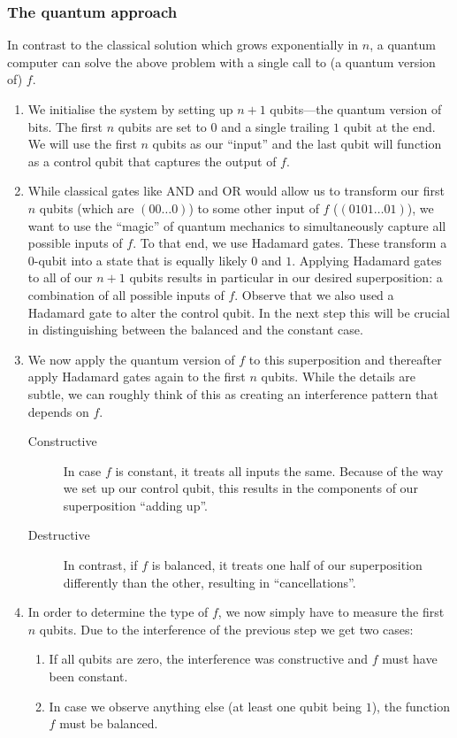 \documentclass[a4paper, oneside, 12pt]{amsart}
\begin{document}
\subsubsection*{The quantum approach}
In contrast to the classical solution which grows exponentially in \(n\), a quantum computer can solve the above problem with a single call to (a quantum version of) \(f\).
\begin{enumerate}
  \item[Step 1:] We initialise the system by setting up \(n+1\) qubits---the quantum version of bits.
  The first \(n\) qubits are set to \(0\) and a single trailing \(1\) qubit at the end.
  We will use the first \(n\) qubits as our ``input'' and the last qubit will function as a control qubit that captures the output of \(f\).

  \item [Step 2:] While classical gates like AND and OR would allow us to transform our first \(n\) qubits (which are \((00\dots0)\)) to some other input of \(f\) (\eg \((0101\dots 01)\)), we want to use the ``magic'' of quantum mechanics to simultaneously capture all possible inputs of \(f\).
  To that end, we use Hadamard gates.
  These transform a \(0\)-qubit into a state that is equally likely \(0\)  and \(1\).
  Applying Hadamard gates to all of our \(n+1\) qubits results in particular in our desired superposition: a combination of all possible inputs of \(f\).
  Observe that we also used a Hadamard gate to alter the control qubit.
  In the next step this will be crucial in distinguishing between the balanced and the constant case.

  \item [Step 3:] We now apply the quantum version of \(f\) to this superposition and thereafter apply  Hadamard gates again to the first \(n\) qubits.
  While the details are subtle, we can roughly think of this as creating an interference pattern that depends on \(f\).
  \begin{description}
    \item [Constructive] In case \(f\) is constant, it treats all inputs the same.
    Because of the way we set up our control qubit, this results in the components of our superposition ``adding up''.
    \item [Destructive] In contrast, if \(f\) is balanced, it treats one half of our superposition differently than the other, resulting in ``cancellations''.
  \end{description}


  \item [Step 4:] In order to determine the type of \(f\), we now simply have to measure the first \(n\) qubits.
  Due to the interference of the previous step we get two cases:
  \begin{enumerate}
    \item If all qubits are zero, the interference was constructive and \(f\) must have been constant.
    \item In case we observe anything else (at least one qubit being \(1\)), the function \(f\) must be balanced.
  \end{enumerate}
\end{enumerate}
\end{document}
